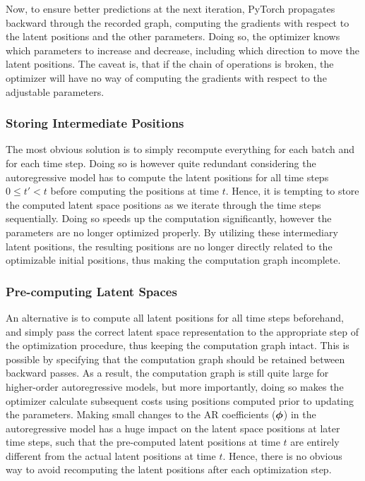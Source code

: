     Now, to ensure better predictions at the next iteration, PyTorch propagates backward through the recorded graph, computing the gradients with respect to the latent positions and the other parameters. Doing so, the optimizer knows which parameters to increase and decrease, including which direction to move the latent positions.
    The caveat is, that if the chain of operations is broken, the optimizer will have no way of computing the gradients with respect to the adjustable parameters. 
    
    \subsubsection{Storing Intermediate Positions}
        
        The most obvious solution is to simply recompute everything for each batch and for each time step. Doing so is however quite redundant considering the autoregressive model has to compute the latent positions for all time steps $0\leq t'<t$ before computing the positions at time $t$. Hence, it is tempting to store the computed latent space positions as we iterate through the time steps sequentially. Doing so speeds up the computation significantly, however the parameters are no longer optimized properly. By utilizing these intermediary latent positions, the resulting positions are no longer directly related to the optimizable initial positions, thus making the computation graph incomplete.
    
    \subsubsection{Pre-computing Latent Spaces}
        
        An alternative is to compute all latent positions for all time steps beforehand, and simply pass the correct latent space representation to the appropriate step of the optimization procedure, thus keeping the computation graph intact. This is possible by specifying that the computation graph should be retained between backward passes. 
        As a result, the computation graph is still quite large for higher-order autoregressive models, but more importantly, doing so makes the optimizer calculate subsequent costs using positions computed prior to updating the parameters. Making small changes to the AR coefficients ($\bm{\phi}$) in the autoregressive model has a huge impact on the latent space positions at later time steps, such that the pre-computed latent positions at time $t$ are entirely different from the actual latent positions at time $t$. Hence, there is no obvious way to avoid recomputing the latent positions after each optimization step.
        
